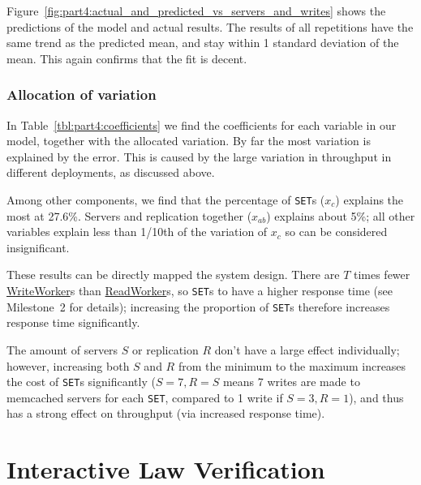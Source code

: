 \documentclass[11pt]{article}
\newcommand{\set}[0]{\texttt{SET}}
\newcommand{\linkmain}[1]{\href{https://gitlab.inf.ethz.ch/pungast/asl-fall16-project/blob/master/src/main/java/asl/#1.java}{#1}}
\begin{document}
Figure~\ref{fig:part4:actual_and_predicted_vs_servers_and_writes} shows the predictions of the model and actual results. The results of all repetitions have the same trend as the predicted mean, and stay within 1 standard deviation of the mean. This again confirms that the fit is decent.

\subsubsection{Allocation of variation}



In Table~\ref{tbl:part4:coefficients} we find the coefficients for each variable in our model, together with the allocated variation. By far the most variation is explained by the error. This is caused by the large variation in throughput in different deployments, as discussed above.

Among other components, we find that the percentage of \set{}s ($x_c$) explains the most at 27.6\%. Servers and replication together ($x_{ab}$) explains about 5\%; all other variables explain less than 1/10th of the variation of $x_c$ so can be considered insignificant.

These results can be directly mapped the system design. There are $T$ times fewer \linkmain{WriteWorker}s than \linkmain{ReadWorker}s, so \set{}s to have a higher response time (see Milestone~2 for details); increasing the proportion of \set{}s therefore increases response time significantly.

The amount of servers $S$ or replication $R$ don't have a large effect individually; however, increasing both $S$ and $R$ from the minimum to the maximum increases the cost of \set{}s significantly ($S=7,R=S$ means 7 writes are made to memcached servers for each \set{}, compared to 1 write if $S=3,R=1$), and thus has a strong effect on throughput (via increased response time).

\clearpage
\section{Interactive Law Verification}\label{sec:part5-interactive-law}
\end{document}
